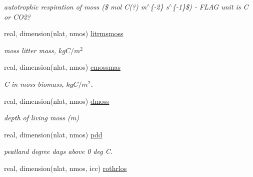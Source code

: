 \begin{DoxyCompactItemize}
\begin{DoxyCompactList}\small\item\em autotrophic respiration of moss (\$ mol C(?) m$^\wedge$\{-\/2\} s$^\wedge$\{-\/1\}\$) -\/ F\+L\+A\+G unit is C or C\+O2? \end{DoxyCompactList}\item 
\hypertarget{structctem__statevars_1_1veg__rot_a85edecea36b56b79ddfd3a30f77a3830}{}real, dimension(nlat, nmos) \hyperlink{structctem__statevars_1_1veg__rot_a85edecea36b56b79ddfd3a30f77a3830}{litrmsmoss}\label{structctem__statevars_1_1veg__rot_a85edecea36b56b79ddfd3a30f77a3830}

\begin{DoxyCompactList}\small\item\em moss litter mass, $kg C/m^2$ \end{DoxyCompactList}\item 
\hypertarget{structctem__statevars_1_1veg__rot_a2ad794f1fd0b92dc35e42553475ce9ef}{}real, dimension(nlat, nmos) \hyperlink{structctem__statevars_1_1veg__rot_a2ad794f1fd0b92dc35e42553475ce9ef}{cmossmas}\label{structctem__statevars_1_1veg__rot_a2ad794f1fd0b92dc35e42553475ce9ef}

\begin{DoxyCompactList}\small\item\em C in moss biomass, $kg C/m^2$. \end{DoxyCompactList}\item 
\hypertarget{structctem__statevars_1_1veg__rot_a1e51c1f35da7b98ada827a2784d3046a}{}real, dimension(nlat, nmos) \hyperlink{structctem__statevars_1_1veg__rot_a1e51c1f35da7b98ada827a2784d3046a}{dmoss}\label{structctem__statevars_1_1veg__rot_a1e51c1f35da7b98ada827a2784d3046a}

\begin{DoxyCompactList}\small\item\em depth of living moss (m) \end{DoxyCompactList}\item 
\hypertarget{structctem__statevars_1_1veg__rot_a631c153c6c9083f2282477f31083e3ec}{}real, dimension(nlat, nmos) \hyperlink{structctem__statevars_1_1veg__rot_a631c153c6c9083f2282477f31083e3ec}{pdd}\label{structctem__statevars_1_1veg__rot_a631c153c6c9083f2282477f31083e3ec}

\begin{DoxyCompactList}\small\item\em peatland degree days above 0 deg C. \end{DoxyCompactList}\item 
\hypertarget{structctem__statevars_1_1veg__rot_a9b507da454ff945f8594997d5e55495f}{}real, dimension(nlat, nmos, icc) \hyperlink{structctem__statevars_1_1veg__rot_a9b507da454ff945f8594997d5e55495f}{rothrlos}\label{structctem__statevars_1_1veg__rot_a9b507da454ff945f8594997d5e55495f}


\end{DoxyCompactItemize}
